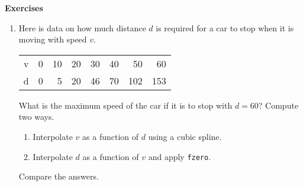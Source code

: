 \documentclass[11pt]{article}
\begin{document}
\begin{center}
  \bf Exercises
\end{center}

\begin{enumerate}
\item Here is data on how much distance $d$ is required for a car to
  stop when it is moving with speed $v$. 
  \begin{tabular}{crrrrrrr}
    v & 0 & 10 & 20 & 30 & 40 & 50 & 60 \\
    d & 0 & 5 & 20 & 46 & 70 & 102 & 153
  \end{tabular}
  What is the maximum speed of the car if it is to stop with $d=60$?
  Compute two ways.
  \begin{enumerate}
  \item Interpolate $v$ as a function of $d$ using a cubic spline.
  \item Interpolate $d$ as a function of $v$ and apply \texttt{fzero}.
  \end{enumerate}
  Compare the answers.



\end{enumerate}
\end{document}
